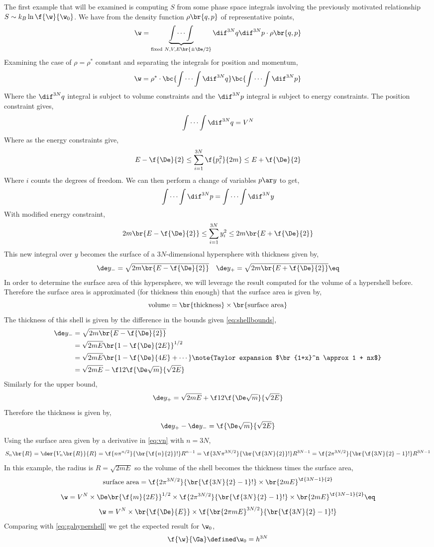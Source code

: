 \documentclass{article}
\begin{document}
The first example that will be examined is computing $S$ from some phase space integrals involving the previously motivated relationship $S \sim k_B \ln \f{\w}{\w_0}$. We have from the density function $\rho\br{q,p}$ of representative points,
\[ \w = \underbrace{\int \cdots \int}_{\text{fixed } N,V,E \br{\pm \De / 2}} \dif^{3N} q \dif^{3N} p \cdot \rho\br{q,p} \]
Examining the case of $\rho = \rho^*$ constant and separating the integrals for position and momentum,
\[ \w = \rho^* \cdot \bc{\int \cdots \int \dif^{3N} q} \bc{\int \cdots \int \dif^{3N} p} \]
Where the $\dif^{3N} q$ integral is subject to volume constraints and the $\dif^{3N} p$ integral is subject to energy constraints. The position constraint gives,
\[ \int \cdots \int \dif^{3N} q = V^N \]
Where as the energy constraints give,
\[ E - \f{\De}{2} \leq \sum_{i=1}^{3N}\f{p_i^2}{2m} \leq E + \f{\De}{2} \]
Where $i$ counts the degrees of freedom. We can then perform a change of variables $p \ar y$ to get,
\[ \int \cdots \int \dif^{3N} p = \int \cdots \int \dif^{3N} y \]
With modified energy constraint,
\[ 2m\br{E - \f{\De}{2}} \leq \sum_{i=1}^{3N}y_i^2 \leq 2m\br{E + \f{\De}{2}} \]
This new integral over $y$ becomes the surface of a $3N$-dimensional hypersphere with thickness given by,
\[ \de y_- = \sqrt{2m\br{E - \f{\De}{2}}} \quad \de y_+ = \sqrt{2m\br{E + \f{\De}{2}}} \eq \label{eq:shellbounds} \]
In order to determine the surface area of this hypersphere, we will leverage the result computed for the volume of a hypershell before. Therefore the surface area is approximated (for thickness thin enough) that the surface area is given by,
\[ \text{volume} = \br{\text{thickness}} \times \br{\text{surface area}} \]
The thickness of this shell is given by the difference in the bounds given \eqref{eq:shellbounds},
\begin{align*}
\de y_- &= \sqrt{2m\br{E - \f{\De}{2}}} \\
&= \sqrt{2mE}\br{1 - \f{\De}{2E}}^{1/2} \\
&= \sqrt{2mE}\br{1 - \f{\De}{4E} + \cdots} \note{Taylor expansion $\br{1+x}^n \approx 1 + nx$} \\
&= \sqrt{2mE} - \f12 \f{\De\sqrt{m}}{\sqrt{2E}}
\end{align*}
Similarly for the upper bound,
\[ \de y_+ = \sqrt{2mE} + \f12 \f{\De\sqrt{m}}{\sqrt{2E}} \]
Therefore the thickness is given by,
\[ \de y_+ - \de y_- = \f{\De\sqrt{m}}{\sqrt{2E}} \]
Using the surface area given by a derivative in \eqref{eq:vn} with $n = 3N$,
\[ S_n \br{R} = \der{V_n\br{R}}{R} = \f{n \pi^{n/2}}{\br{\f{n}{2}}!} R^{n-1} = \f{3N \pi^{3N/2}}{\br{\f{3N}{2}}!} R^{3N-1} = \f{2\pi^{3N/2}}{\br{\f{3N}{2} - 1}!} R^{3N-1} \]
In this example, the radius is $R = \sqrt{2mE}$ so the volume of the shell becomes the thickness times the surface area,
\[ \text{surface area} = \f{2\pi^{3N/2}}{\br{\f{3N}{2} - 1}!} \times \br{2mE}^{\f{3N - 1}{2}} \]
\[ \w = V^N \times \De \br{\f{m}{2E}}^{1/2} \times \f{2\pi^{3N/2}}{\br{\f{3N}{2} - 1}!} \times \br{2mE}^{\f{3N - 1}{2}} \eq \label{eq:omega} \]
\[ \w = V^N \times \br{\f{\De}{E}} \times \f{\br{2 \pi m E}^{3N/2}}{\br{\f{3N}{2} - 1}!} \]
Comparing with \eqref{eq:gahypershell} we get the expected result for $\w_0$,
\[ \f{\w}{\Ga} \defined \w_0 = h^{3N} \]
\end{document}
